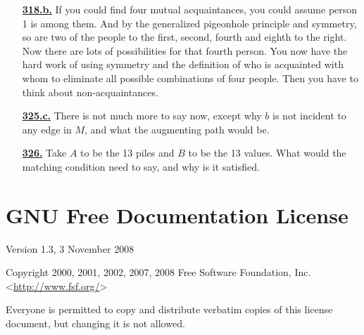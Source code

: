 \documentclass[10pt,]{book}
\theoremstyle{plain}
\theoremstyle{definition}
\theoremstyle{definition}
\theoremstyle{definition}
\numberwithin{equation}{chapter}
\begin{document}
\begin{itemize}[itemsep=1em]
\hypertarget{a-318.b}{}\item[\textbf{\hyperref[task-282]{318.b.}}]
\hypertarget{p-1686}{}%
If you could find four mutual acquaintances, you could assume person 1 is among them. And by the generalized pigeonhole principle and symmetry, so are two of the people to the first, second, fourth and eighth to the right. Now there are lots of possibilities for that fourth person. You now have the hard work of using symmetry and the definition of who is acquainted with whom to eliminate all possible combinations of four people. Then you have to think about non-acquaintances.%

\hypertarget{a-325.c}{}\item[\textbf{\hyperref[task-288]{325.c.}}]
\hypertarget{p-1717}{}%
There is not much more to say now, except why \(b\) is not incident to any edge in \(M\), and what the augmenting path would be.%

\hypertarget{a-326}{}\item[\textbf{\hyperref[activity-319]{326.}}]
\hypertarget{p-1720}{}%
Take \(A\) to be the 13 piles and \(B\) to be the 13 values.  What would the matching condition need to say, and why is it satisfied.%

\end{itemize}
\typeout{************************************************}
\typeout{************************************************}
\chapter[{GNU Free Documentation License}]{GNU Free Documentation License}\label{appendix-gfdl}
\hypertarget{p-2834}{}%
Version 1.3, 3 November 2008%
\par
\hypertarget{p-2835}{}%
Copyright \textcopyright{} 2000, 2001, 2002, 2007, 2008 Free Software Foundation, Inc. \textless{}\url{http://www.fsf.org/}\textgreater{}%
\par
\hypertarget{p-2836}{}%
Everyone is permitted to copy and distribute verbatim copies of this license document, but changing it is not allowed.%
\typeout{************************************************}
\typeout{************************************************}
\end{document}
